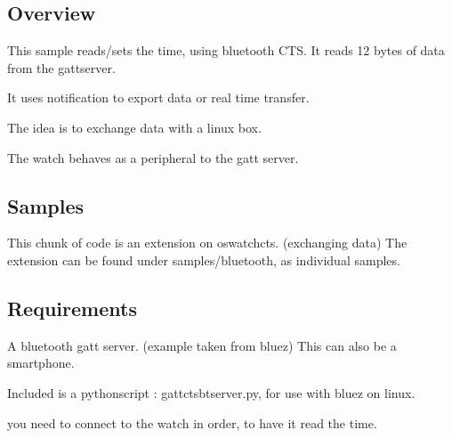 \documentclass[letterpaper,10pt,english]{sphinxmanual}
\begin{document}
\subsection{Overview}
\label{\detokenize{samples/apposwatch-btREADME:overview}}
This sample reads/sets the time, using bluetooth CTS.
It reads 12 bytes of data from the gatt\sphinxhyphen{}server.

It uses notification to export data or real time transfer.

The idea is to exchange data with a linux box.

The watch behaves as a peripheral to the gatt server.


\subsection{Samples}
\label{\detokenize{samples/apposwatch-btREADME:samples}}
This chunk of code is an extension on oswatch\sphinxhyphen{}cts. (exchanging data)
The extension can be found under samples/bluetooth, as individual samples.


\subsection{Requirements}
\label{\detokenize{samples/apposwatch-btREADME:requirements}}
A bluetooth gatt server. (example taken from bluez)
This can also be a smartphone.

Included is a python\sphinxhyphen{}script :  gatt\sphinxhyphen{}cts\sphinxhyphen{}bt\sphinxhyphen{}server.py, for use with bluez on linux.

\begin{sphinxVerbatim}[commandchars=\\\{\}]
  
\end{sphinxVerbatim}

you need to connect to the watch in order, to have it read the time.

\begin{sphinxVerbatim}[commandchars=\\\{\}]
      
      
\end{sphinxVerbatim}
\end{document}
